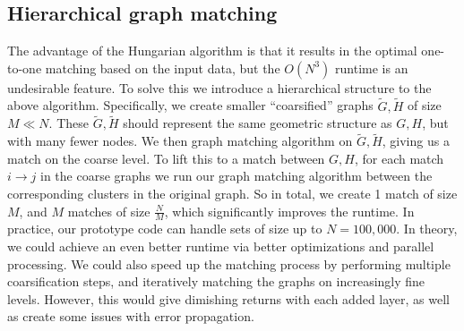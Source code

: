 \documentclass[journal]{IEEEtran}
\begin{document}


\vspace*{-0.5cm}
\subsection{Hierarchical graph matching}
\label{subsec:hierarchical}

The advantage of the Hungarian algorithm is that it results in the optimal
one-to-one matching based on the input data, but the $O(N^3)$ runtime is an
undesirable feature. To solve this we introduce a hierarchical structure to the
above algorithm. Specifically, we create smaller ``coarsified'' graphs
$\tilde{G},\tilde{H}$ of size $M \ll N$. These $\tilde{G},\tilde{H}$ should
represent the same geometric structure as $G,H$, but with many fewer nodes. We
then graph matching algorithm on $\tilde{G},\tilde{H}$, giving us a match on the
coarse level. To lift this to a match between $G,H$, for each match $i \to j$ in
the coarse graphs we run our graph matching algorithm between the corresponding
clusters in the original graph. So in total, we create 1 match of size $M$, and
$M$ matches of size $\frac{N}{M}$, which significantly improves the runtime. In
practice, our prototype code can handle sets of size up to $N = 100,000$.  In
theory, we could achieve an even better runtime via better optimizations and
parallel processing. We could also speed up the matching process by performing
multiple coarsification steps, and iteratively matching the graphs on
increasingly fine levels. However, this would give dimishing returns with each
added layer, as well as create some issues with error propagation.
\vspace*{-0.5cm}
\end{document}

